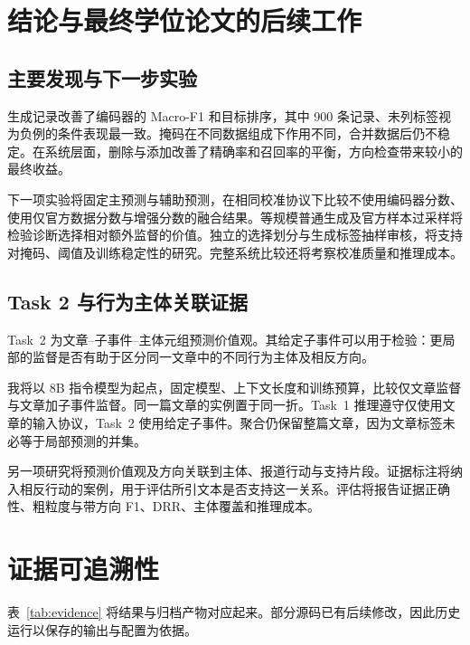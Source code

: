 \documentclass[12pt,a4paper]{article}
\begin{document}
\sectionbreak
\section{结论与最终学位论文的后续工作}\label{sec:conclusion}
\subsection{主要发现与下一步实验}
生成记录改善了编码器的 Macro-F1 和目标排序，其中 900 条记录、未列标签视为负例的条件表现最一致。掩码在不同数据组成下作用不同，合并数据后仍不稳定。在系统层面，删除与添加改善了精确率和召回率的平衡，方向检查带来较小的最终收益。

下一项实验将固定主预测与辅助预测，在相同校准协议下比较不使用编码器分数、使用仅官方数据分数与增强分数的融合结果。等规模普通生成及官方样本过采样将检验诊断选择相对额外监督的价值。独立的选择划分与生成标签抽样审核，将支持对掩码、阈值及训练稳定性的研究。完整系统比较还将考察校准质量和推理成本。

\subsection{Task 2 与行为主体关联证据}
Task~2 为文章--子事件--主体元组预测价值观。其给定子事件可以用于检验：更局部的监督是否有助于区分同一文章中的不同行为主体及相反方向。

我将以 8B 指令模型为起点，固定模型、上下文长度和训练预算，比较仅文章监督与文章加子事件监督。同一篇文章的实例置于同一折。Task~1 推理遵守仅使用文章的输入协议，Task~2 使用给定子事件。聚合仍保留整篇文章，因为文章标签未必等于局部预测的并集。

另一项研究将预测价值观及方向关联到主体、报道行动与支持片段。证据标注将纳入相反行动的案例，用于评估所引文本是否支持这一关系。评估将报告证据正确性、粗粒度与带方向 F1、DRR、主体覆盖和推理成本。


\FloatBarrier
\clearpage
\appendix

\section{证据可追溯性}
表~\ref{tab:evidence} 将结果与归档产物对应起来。部分源码已有后续修改，因此历史运行以保存的输出与配置为依据。
\end{document}
